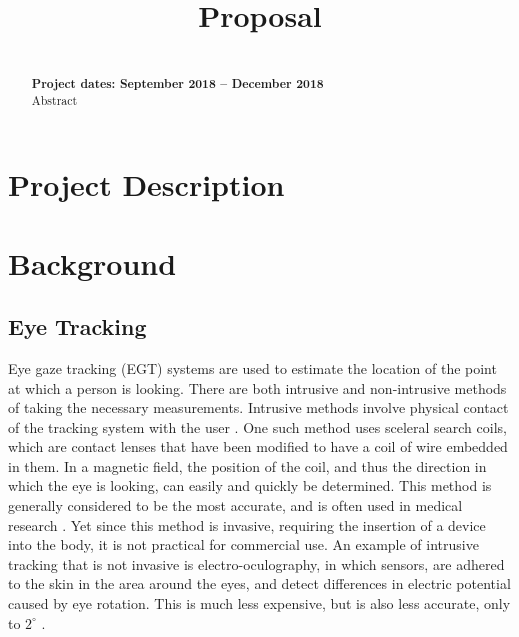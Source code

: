 \documentclass[12pt,conference,onecolumn]{IEEEtran}
\begin{document}
\title{Proposal}
\author{
	\and
	\and
}

\maketitle
\renewcommand{\baselinestretch}{1.5} 
\begin{abstract}
\textbf{\\Project dates: September 2018 -- December 2018\\}
\textnormal{
	Abstract
}
\end{abstract}
\IEEEpeerreviewmaketitle

\section{Project Description} \label{sec:proj_desc}

\section{Background} \label{sec:background}
\subsection{Eye Tracking}
Eye gaze tracking (EGT) systems are used to estimate the location of the point at which a person is looking. There are both intrusive and non-intrusive methods of taking the necessary measurements. Intrusive methods involve physical contact of the tracking system with the user
. One such method uses sceleral search coils, which are contact lenses that have been modified to have a coil of wire embedded in them. In a magnetic field, the position of the coil, and thus the direction in which the eye is looking, can easily and quickly be determined. This method is generally considered to be the most accurate, and is often used in medical research \cite{chennamma2013survey}. Yet since this method is invasive, requiring the insertion of a device into the body, it is not practical for commercial use. An example of intrusive tracking that is not invasive is electro-oculography, in which sensors, are adhered to the skin in the area around the eyes, and detect differences in electric potential caused by eye rotation. This is much less expensive, but is also less accurate, only to $2^{\circ}$ \cite{morimoto}.
\end{document}
